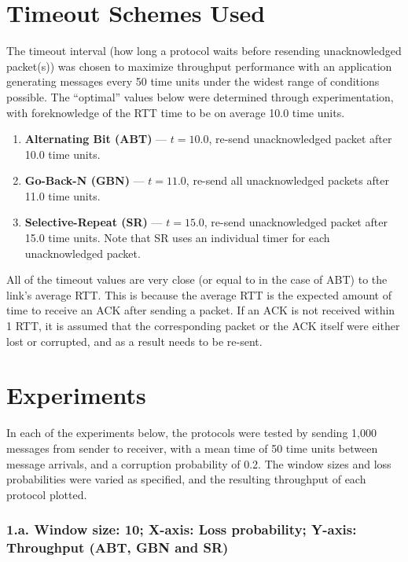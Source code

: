 \documentclass{article}
\begin{document}
\pagebreak

\section{Timeout Schemes Used}
The timeout interval (how long a protocol waits before resending unacknowledged packet(s)) was chosen to maximize throughput performance with an application generating messages every 50 time units under the widest range of conditions possible. The ``optimal'' values below were determined through experimentation, with foreknowledge of the RTT time to be on average 10.0 time units. 

\begin{enumerate}
    \item \textbf{Alternating Bit (ABT)} --- $t=10.0$, re-send unacknowledged packet after 10.0 time units.
    \item \textbf{Go-Back-N (GBN)} --- $t=11.0$, re-send all unacknowledged packets after 11.0 time units.
    \item \textbf{Selective-Repeat (SR)} --- $t=15.0$, re-send unacknowledged packet after 15.0 time units. Note that SR uses an individual timer for each unacknowledged packet.
\end{enumerate}

All of the timeout values are very close (or equal to in the case of ABT) to the link's average RTT. This is because the average RTT is the expected amount of time to receive an ACK after sending a packet. If an ACK is not received within 1 RTT, it is assumed that the corresponding packet or the ACK itself were either lost or corrupted, and as a result needs to be re-sent.

\pagebreak

\section{Experiments}

In each of the experiments below, the protocols were tested by sending 1,000 messages from sender to receiver, with a mean time of 50 time units between message arrivals, and a corruption probability of 0.2. The window sizes and loss probabilities were varied as specified, and the resulting throughput of each protocol plotted.

\subsubsection{1.a. Window size: 10; X-axis: Loss probability; Y-axis: Throughput (ABT, GBN and SR)}
\end{document}
